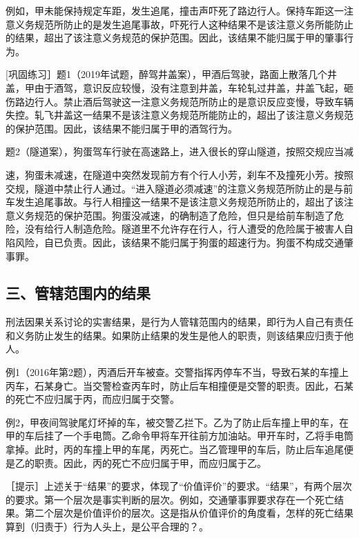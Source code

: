 例如，甲未能保持规定车距，发生追尾，撞击声吓死了路边行人。保持车距这一注意义务规范所防止的是发生追尾事故，吓死行人这种结果不是该注意义务所能防止的结果，超出了该注意义务规范的保护范围。因此，该结果不能归属于甲的肇事行为。

[巩固练习］题1（2019年试题，醉驾井盖案），甲酒后驾驶，路面上散落几个井盖，甲由于酒驾，意识反应较慢，没有注意到井盖，车轮轧过井盖，井盖飞起，砸伤路边行人。禁止酒后驾驶这一注意义务规范所防止的是意识反应变慢，导致车辆失控。轧飞井盖这一结果不是该注意义务规范所能防止的，超出了该注意义务规范的保护范围。因此，该结果不能归属于甲的酒驾行为。

题2（隧道案），狗蛋驾车行驶在高速路上，进入很长的穿山隧道，按照交规应当减

速，狗蛋未减速，在隧道中突然发现前方有个行人小芳，刹车不及撞死小芳。按照交规，隧道中禁止行人通过。“进入隧道必须减速”的注意义务规范所防止的是与前车发生追尾事故。与行人相撞这一结果不是该注意义务规范所防止的，超出了该注意义务规范的保护范围。狗蛋没减速，的确制造了危险，但只是给前车制造了危险，没有给行人制造危险。隧道里不允许存在行人，行人遭受的危险属于被害人自陷风险，自已负责。因此，该结果不能归属于狗蛋的超速行为。狗蛋不构成交通肇事罪。

\subsection*{三、管辖范围内的结果}

刑法因果关系讨论的实害结果，是行为人管辖范围内的结果，即行为人自己有责任和义务防止发生的结果。如果防止结果的发生是他人的职责，则该结果应归责于他人。

例1（2016年第2题），丙酒后开车被查。交警指挥丙停车不当，导致石某的车撞上丙车，石某身亡。当交警检查丙车时，防止后车相撞便是交警的职责。因此，石某的死亡不应归属于丙，而应归属于交警。

例2，甲夜间驾驶尾灯坏掉的车，被交警乙拦下。乙为了防止后车撞上甲的车，在甲的车后挂了一个手电筒。乙命令甲将车开往前方加油站。甲开车时，乙将手电筒拿掉。此时，丙的车撞上甲的车尾，丙死亡。当乙管理甲的车后，防止后车追尾便是乙的职责。因此，丙的死亡不应归属于甲，而应归属于乙。

［提示］上述关于“结果”的要求，体现了“价值评价”的要求。“结果”，有两个层次的要求。第一个层次是事实判断的层次。例如，交通肇事罪要求存在一个死亡结果。第二个层次是价值评价的层次。这是指从价值评价的角度看，怎样的死亡结果算到（归责于）行为人头上，是公平合理的？。

